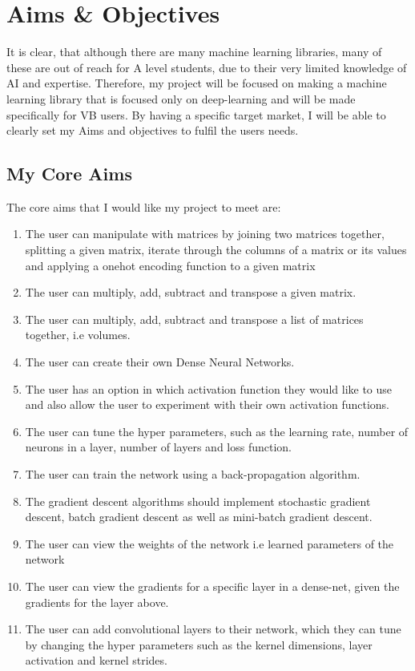 \section{Aims \& Objectives}
It is clear, that although there are many machine learning libraries, many of these are out of reach for A level students, due to their very limited knowledge of AI and expertise. Therefore, my project will be focused on making a machine learning library that is focused only on deep-learning and will be made specifically for VB users. By having a specific target market, I will be able to clearly set my Aims and objectives to fulfil the users needs.
\subsection{My Core Aims}
The core aims that I would like my project to meet are:
\begin{enumerate}
    \item The user can manipulate with matrices by joining two matrices together, splitting a given matrix, iterate through the columns of a matrix or its values and applying a onehot encoding function to a given matrix
    \item The user can multiply, add, subtract and transpose a given matrix.
    \item The user can multiply, add, subtract and transpose a list of matrices together, i.e volumes.
    \item The user can create their own Dense Neural Networks.
    \item The user has an option in which activation function they would like to use and also allow the user to experiment with their own activation functions.
    \item The user can tune the hyper parameters, such as the learning rate, number of neurons in a layer, number of layers and loss function.
    \item The user can train the network using a back-propagation algorithm.
    \item The gradient descent algorithms should implement stochastic gradient descent, batch gradient descent as well as mini-batch gradient descent.
    \item The user can view the weights of the network i.e learned parameters of the network
    \item The user can view the gradients for a specific layer in a dense-net, given the gradients for the layer above.
    \item The user can add convolutional layers to their network, which they can tune by changing the hyper parameters such as the kernel dimensions, layer activation and kernel strides. 
\end{enumerate}
